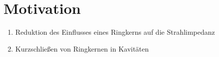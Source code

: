 \section{Motivation}
    \begin{enumerate}
        \item Reduktion des Einflusses eines Ringkerns auf die Strahlimpedanz
        \item Kurzschließen von Ringkernen in Kavitäten
    \end{enumerate}